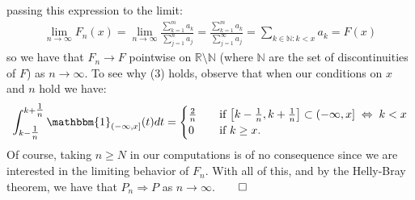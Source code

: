 \documentclass[10pt]{article}
\newcommand{\mbb}[1]{\mathbb{#1}}
\newcommand{\1}[1]{\mathbbm{1}_{#1}}
\begin{document}
    passing this expression to the limit:
    \begin{align*}
        \lim_{n\rightarrow\infty}F_n(x)=\lim_{n\rightarrow\infty}\frac{\sum_{k=1}^ma_k}{\sum_{j=1}^na_j}=\frac{\sum_{k=1}^ma_k}{\sum_{j=1}^\infty a_j}=\sum_{k\in\mbb{N}:k<x}a_k=F(x)
    \end{align*}
    so we have that $F_n\rightarrow F$ pointwise on $\mbb{R}\setminus\mbb{N}$ (where $\mbb{N}$ are the set of discontinuities of $F$) as $n\rightarrow\infty$. To see why (3) holds, observe that when our conditions on $x$ and $n$ hold we have:
    \begin{align*}
        \int_{k-\tfrac{1}{n}}^{k+\tfrac{1}{n}}\1{(-\infty,x]}(t)dt=\begin{cases}
            \frac{2}{n}\quad&\text{if $\left[k-\tfrac{1}{n},k+\tfrac{1}{n}\right]\subset(-\infty,x]\;\Leftrightarrow\;k<x$}\\
            0\quad&\text{if $k\geq x$.}
        \end{cases}
    \end{align*}
    Of course, taking $n\geq N$ in our computations is of no consequence since we are interested in the limiting behavior of $F_n$. With all of this, and by the Helly-Bray theorem, we have that
    $P_n\Longrightarrow P$ as $n\rightarrow\infty$.\hfill{$\qed$}\\[5pt]
\end{document}
